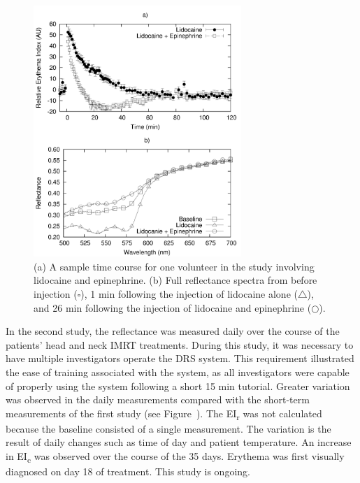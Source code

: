 \begin{figure}
	\centering \includegraphics[width=0.7\textwidth]{figures/p1-lido_epi.png}
	\caption[Sample time course for lidocaine \& epinephrine]{\label{fig:p1-lido_epi}(a) A sample time course for one volunteer in the study involving lidocaine and epinephrine. (b) Full reflectance spectra from before injection ($\square$), 1 min following the injection of lidocaine alone ($\triangle$), and 26 min following the injection of lidocaine and epinephrine ($\bigcirc$).}
\end{figure}

In the second study, the reflectance was measured daily over the course of the patients’ head and neck IMRT treatments. During this study, it was necessary to have multiple investigators operate the DRS system. This requirement illustrated the ease of training associated with the system, as all investigators were capable of properly using the system following a short 15 min tutorial. Greater variation was observed in the daily measurements compared with the short-term measurements of the first study (see Figure~). The EI\textsubscript{r} was not calculated because the baseline consisted of a single measurement. The variation is the result of daily changes such as time of day and patient temperature.\cite{Fullerton1996} An increase in EI\textsubscript{c} was observed over the course of the 35 days. Erythema was first visually diagnosed on day 18 of treatment. This study is ongoing.

